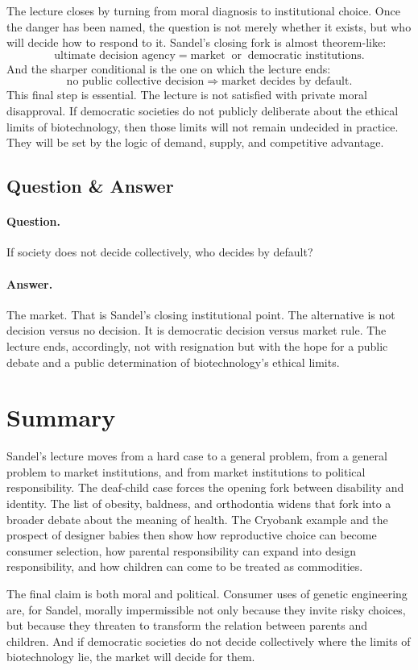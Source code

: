 The lecture closes by turning from moral diagnosis to institutional choice. Once the danger has been named, the question is not merely whether it exists, but who will decide how to respond to it. Sandel's closing fork is almost theorem-like:
\begin{equation}
\text{ultimate decision agency}
=
\text{market}
\;\;\text{or}\;\;
\text{democratic institutions}.
\end{equation}
And the sharper conditional is the one on which the lecture ends:
\begin{equation}
\text{no public collective decision}
\Longrightarrow
\text{market decides by default}.
\end{equation}
This final step is essential. The lecture is not satisfied with private moral disapproval. If democratic societies do not publicly deliberate about the ethical limits of biotechnology, then those limits will not remain undecided in practice. They will be set by the logic of demand, supply, and competitive advantage.

\subsection{Question \& Answer}

\paragraph{Question.} If society does not decide collectively, who decides by default?

\paragraph{Answer.} The market. That is Sandel's closing institutional point. The alternative is not decision versus no decision. It is democratic decision versus market rule. The lecture ends, accordingly, not with resignation but with the hope for a public debate and a public determination of biotechnology's ethical limits.

\section{Summary}

Sandel's lecture moves from a hard case to a general problem, from a general problem to market institutions, and from market institutions to political responsibility. The deaf-child case forces the opening fork between disability and identity. The list of obesity, baldness, and orthodontia widens that fork into a broader debate about the meaning of health. The Cryobank example and the prospect of designer babies then show how reproductive choice can become consumer selection, how parental responsibility can expand into design responsibility, and how children can come to be treated as commodities.

The final claim is both moral and political. Consumer uses of genetic engineering are, for Sandel, morally impermissible not only because they invite risky choices, but because they threaten to transform the relation between parents and children. And if democratic societies do not decide collectively where the limits of biotechnology lie, the market will decide for them.